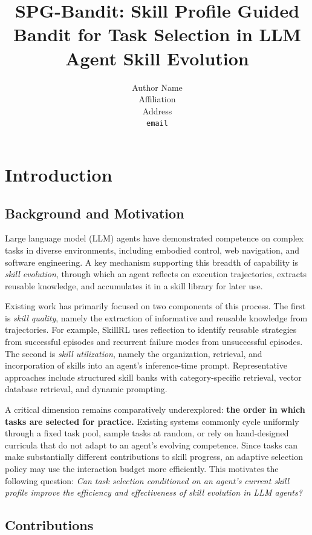 \documentclass{article} %
\title{SPG-Bandit: Skill Profile Guided Bandit for Task Selection in LLM Agent Skill Evolution}
\author{Author Name \\
Affiliation \\
Address \\
\texttt{email} \\
}
\begin{document}
\maketitle

\section{Introduction}
\label{sec:introduction}

\subsection{Background and Motivation}

Large language model (LLM) agents have demonstrated competence on complex tasks in diverse environments, including embodied control, web navigation, and software engineering. A key mechanism supporting this breadth of capability is \emph{skill evolution}, through which an agent reflects on execution trajectories, extracts reusable knowledge, and accumulates it in a skill library for later use.

Existing work has primarily focused on two components of this process. The first is \emph{skill quality}, namely the extraction of informative and reusable knowledge from trajectories. For example, SkillRL uses reflection to identify reusable strategies from successful episodes and recurrent failure modes from unsuccessful episodes. The second is \emph{skill utilization}, namely the organization, retrieval, and incorporation of skills into an agent's inference-time prompt. Representative approaches include structured skill banks with category-specific retrieval, vector database retrieval, and dynamic prompting.

A critical dimension remains comparatively underexplored: \textbf{the order in which tasks are selected for practice.} Existing systems commonly cycle uniformly through a fixed task pool, sample tasks at random, or rely on hand-designed curricula that do not adapt to an agent's evolving competence. Since tasks can make substantially different contributions to skill progress, an adaptive selection policy may use the interaction budget more efficiently. This motivates the following question: \emph{Can task selection conditioned on an agent's current skill profile improve the efficiency and effectiveness of skill evolution in LLM agents?}

\subsection{Contributions}
\end{document}
